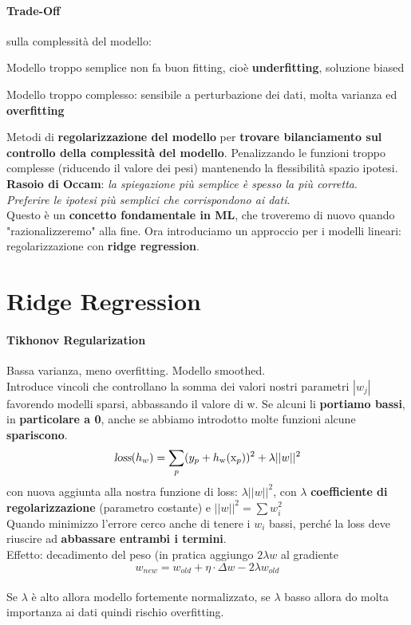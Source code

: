\documentclass[10pt]{book}
\begin{document}
\paragraph{Trade-Off} sulla complessità del modello:
\begin{list}{}{}
	\item Modello troppo semplice non fa buon fitting, cioè \textbf{underfitting}, soluzione biased
	\item Modello troppo complesso: sensibile a perturbazione dei dati, molta varianza ed \textbf{overfitting}
\end{list}
Metodi di \textbf{regolarizzazione del modello} per \textbf{trovare bilanciamento sul controllo della complessità del modello}. Penalizzando le funzioni troppo complesse (riducendo il valore dei pesi) mantenendo la flessibilità spazio ipotesi.\\
\textbf{Rasoio di Occam}: \textit{la spiegazione più semplice è spesso la più corretta}.\\\textit{Preferire le ipotesi più semplici che corrispondono ai dati}.\\
Questo è un \textbf{concetto fondamentale in ML}, che troveremo di nuovo quando "razionalizzeremo" alla fine. Ora introduciamo un approccio per i modelli lineari: regolarizzazione con \textbf{ridge regression}.
\pagebreak
\section{Ridge Regression}
\paragraph{Tikhonov Regularization} Bassa varianza, meno overfitting. Modello smoothed.\\
Introduce vincoli che controllano la somma dei valori nostri parametri $|w_j|$ favorendo modelli sparsi, abbassando il valore di w. Se alcuni li \textbf{portiamo bassi}, in \textbf{particolare a 0}, anche se abbiamo introdotto molte funzioni alcune \textbf{spariscono}.
$$\textsl{loss}(h_w) = \sum_p (y_p + h_\text{w}(\text{x}_p))^2 + \lambda ||w||^2 $$ con nuova aggiunta alla nostra funzione di loss: $\lambda ||w||^2$, con $\lambda$ \textbf{coefficiente di regolarizzazione} (parametro costante) e $||w||^2 = \sum w_i^2$\\
Quando minimizzo l'errore cerco anche di tenere i $w_i$ bassi, perché la loss deve riuscire ad \textbf{abbassare entrambi i termini}.\\
Effetto: decadimento del peso (in pratica aggiungo $2\lambda w$ al gradiente
$$w_{new} = w_{old} + \eta\cdot\Delta w - 2\lambda w_{old}$$\\
Se $\lambda$ è alto allora modello fortemente normalizzato, se $\lambda$ basso allora do molta importanza ai dati quindi rischio overfitting.
\end{document}

